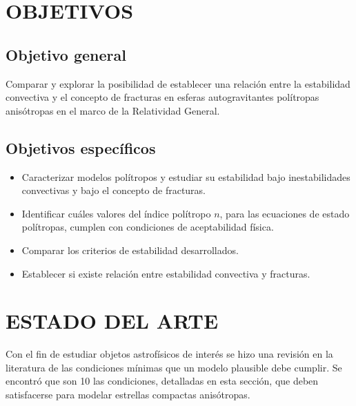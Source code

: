 \documentclass[letterpaper,11pt]{article}
\begin{document}



\section{OBJETIVOS}

	\subsection{Objetivo general}
    	
Comparar y explorar la posibilidad de establecer una relación entre la estabilidad convectiva y el concepto de fracturas en esferas autogravitantes polítropas anisótropas en el marco de la Relatividad General.
        
    
    \subsection{Objetivos específicos}
            
\begin{itemize}


\item  Caracterizar modelos polítropos y estudiar su estabilidad bajo inestabilidades convectivas y bajo el concepto de fracturas.

\item Identificar cuáles valores del índice polítropo $n$, para las ecuaciones de estado polítropas, cumplen con condiciones de aceptabilidad física.

\item Comparar los criterios de estabilidad desarrollados. 

\item Establecer si existe relación entre estabilidad convectiva y fracturas.



\end{itemize}
        
    
\section{ESTADO DEL ARTE}
Con el fin de estudiar objetos astrofísicos de interés se hizo una revisión en la literatura de las condiciones mínimas que un modelo plausible debe cumplir. Se encontró que son 10 las condiciones, detalladas en esta sección, que deben satisfacerse para modelar estrellas compactas anisótropas.
\end{document}
